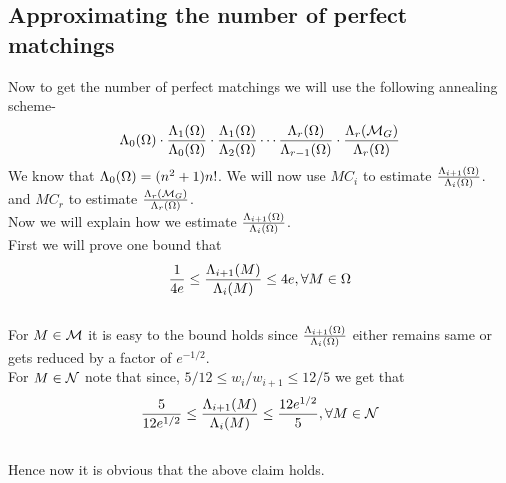 \subsection{Approximating the number of perfect matchings}
\begin{flushleft}
	Now to get the number of perfect matchings we will use the following annealing scheme-
	$$\Lambda_0(\Omega)\cdot\frac{\Lambda_1(\Omega)}{\Lambda_0(\Omega)}\cdot\frac{\Lambda_1(\Omega)}{\Lambda_2(\Omega)}\cdots \frac{\Lambda_{r}(\Omega)}{\Lambda_{r-1}(\Omega)}\cdot
	\frac{\Lambda_r(\mathcal{M}_G)}{\Lambda_r(\Omega)}$$
	We know that $\Lambda_0(\Omega) = (n^2+1)n!$. We will now use $MC_i$ to estimate $\frac{\Lambda_{i+1}(\Omega)}{\Lambda_i(\Omega)}$.\\
	and $MC_r$ to estimate $\frac{\Lambda_r(\mathcal{M}_G)}{\Lambda_r(\Omega)}$.
	\\Now we will explain how we estimate $\frac{\Lambda_{i+1}(\Omega)}{\Lambda_i(\Omega)}$. \\
	First we will prove one bound that $$\frac{1}{4e}\leq\frac{\Lambda_{i+1}(M)}{\Lambda_i(M)}\leq 4e, \forall M \in \Omega$$ 
	\\For $M\in \mathcal{M}$ it is easy to the bound holds since $\frac{\Lambda_{i+1}(\Omega)}{\Lambda_i(\Omega)}$ either remains same or gets reduced by a factor of $e^{-1/2}$.\\
	For $M\in \mathcal{N}$ note that since, $5/12 \leq w_i/w_{i+1} \leq 12/5$ we get that $$\frac{5}{12e^{1/2}}\leq\frac{\Lambda_{i+1}(M)}{\Lambda_i(M)}\leq \frac{12e^{1/2}}{5}, \forall M \in \mathcal{N}$$\\Hence now it is obvious that the above claim holds.
	
\end{flushleft}
